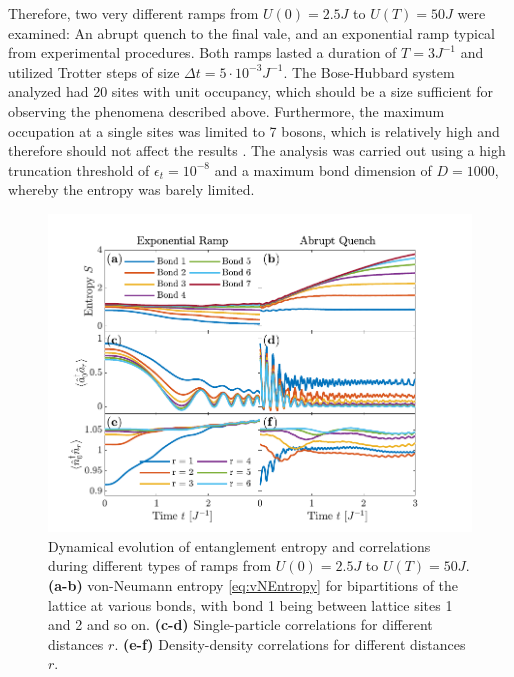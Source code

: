 Therefore, two very different ramps from $U(0) = 2.5 J$ to $U(T) = 50 J$ were examined: An abrupt quench to the final vale, and an exponential ramp typical from experimental procedures. Both ramps lasted a duration of $T = 3 J^{-1}$ and utilized Trotter steps of size $\Delta t = 5 \cdot 10^{-3} J^{-1}$. The Bose-Hubbard system analyzed had 20 sites with unit occupancy, which should be a size sufficient for observing the phenomena described above. Furthermore, the maximum occupation at a single sites was limited to 7 bosons, which is relatively high and therefore should not affect the results \cite{Braun2015}. The analysis was carried out using a high truncation threshold of $\epsilon_t = 10^{-8}$ and a maximum bond dimension of $D = 1000$, whereby the entropy was barely limited.\\
\begin{figure}[h!]
    \centering
    \includegraphics[width=\textwidth]{Figures/L20/EntanglementGrowth.pdf}
    \caption{Dynamical evolution of entanglement entropy and correlations during different types of ramps from $U(0) = 2.5 J$ to $U(T) = 50 J$. \textbf{(a-b)} von-Neumann entropy \eqref{eq:vNEntropy} for bipartitions of the lattice at various bonds, with bond 1 being between lattice sites 1 and 2 and so on. \textbf{(c-d)} Single-particle correlations for different distances $r$. \textbf{(e-f)} Density-density correlations for different distances $r$.}
    \label{fig:EntanglementGrowth}
\end{figure}

